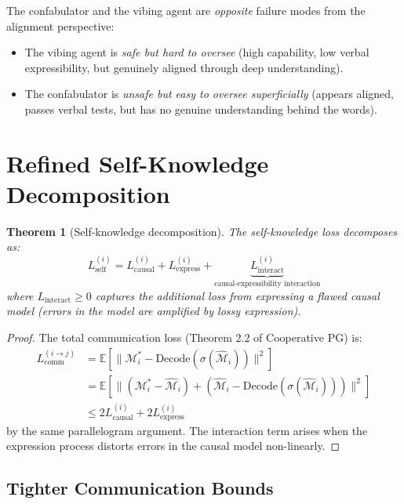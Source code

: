 \documentclass[11pt,a4paper]{article}
\newtheorem{theorem}{Theorem}[section]
\newcommand{\E}{\mathbb{E}}
\newcommand{\norm}[1]{\|#1\|}
\begin{document}
The confabulator and the vibing agent are \emph{opposite} failure modes
from the alignment perspective:
\begin{itemize}
    \item The vibing agent is \emph{safe but hard to oversee} (high
    capability, low verbal expressibility, but genuinely aligned
    through deep understanding).
    \item The confabulator is \emph{unsafe but easy to oversee
    superficially} (appears aligned, passes verbal tests, but has
    no genuine understanding behind the words).
\end{itemize}


\section{Refined Self-Knowledge Decomposition}

\begin{theorem}[Self-knowledge decomposition]\label{thm:decomp}
The self-knowledge loss decomposes as:
\begin{equation}\label{eq:decomp}
    L_{\text{self}}^{(i)} = L_{\text{causal}}^{(i)} + L_{\text{express}}^{(i)}
    + \underbrace{L_{\text{interact}}^{(i)}}_{\text{causal-expressibility interaction}}
\end{equation}
where $L_{\text{interact}} \geq 0$ captures the additional loss from
expressing a flawed causal model (errors in the model are amplified
by lossy expression).
\end{theorem}

\begin{proof}
The total communication loss (Theorem 2.2 of Cooperative PG) is:
\begin{align}
    L_{\text{comm}}^{(i \to j)}
    &= \E[\norm{\mathcal{M}_i^* - \text{Decode}(\sigma(\hat{\mathcal{M}}_i))}^2] \\
    &= \E[\norm{(\mathcal{M}_i^* - \hat{\mathcal{M}}_i) +
              (\hat{\mathcal{M}}_i - \text{Decode}(\sigma(\hat{\mathcal{M}}_i)))}^2] \\
    &\leq 2 L_{\text{causal}}^{(i)} + 2 L_{\text{express}}^{(i)}
\end{align}
by the same parallelogram argument. The interaction term arises
when the expression process distorts errors in the causal model
non-linearly.
\end{proof}


\subsection{Tighter Communication Bounds}
\end{document}
